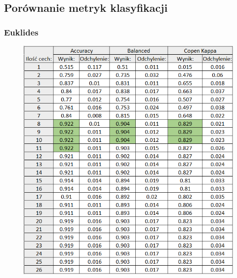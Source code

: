 \documentclass[12pt]{article}
\begin{document}

\subsection{Porównanie metryk klasyfikacji}
\subsubsection{Euklides}
\begin{figure}[H]
	\centering
		\includegraphics[scale=0.9]{images/metrics/9nn_euklides_norm_tab.png}
\end{figure}
\end{document}
